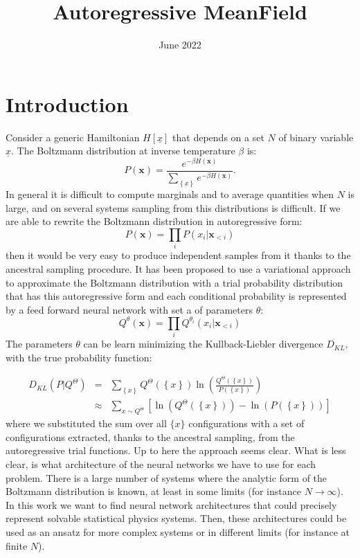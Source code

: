 \documentclass{article}
\title{Autoregressive MeanField}
\date{June 2022}
\begin{document}
\maketitle

\tableofcontents

\section{Introduction}
Consider a generic Hamiltonian $H[\underline{x}]$ that depends on a set $N$ of binary variable $\underline{x}$. The Boltzmann distribution at inverse temperature $\beta$ is:
\begin{equation}
P\left(\mathbf{x}\right)=\frac{e^{-\beta H\left(\mathbf{x}\right)}}{\sum_{\left\{ x\right\} }e^{-\beta H\left(\mathbf{x}\right)}}.
\end{equation}
In general it is difficult to compute marginals and to average quantities when $N$ is large, and on several systems sampling from this distributions is difficult. If we are able to rewrite the Boltzmann distribution in autoregressive form:
\begin{equation}
P\left(\mathbf{x}\right)=\prod_{i}P\left(x_{i}|\mathbf{x}_{<i}\right)
\end{equation}
then it would be very easy to produce independent samples from it thanks to the ancestral sampling procedure. It has been proposed to use a variational approach to approximate the Boltzmann distribution with a trial probability distribution that has this autoregressive form and each conditional probability is represented by a feed forward neural network with set a of parameters ${\theta}$:
\begin{equation}
Q^{\theta}\left(\mathbf{x}\right)=\prod_{i}Q^{\theta_i}\left(x_{i}|\mathbf{x}_{<i}\right)
\end{equation}
The parameters ${\theta}$ can be learn minimizing the Kullback-Liebler divergence $D_{KL}$,
with the true probability function:

\begin{eqnarray*}
D_{KL}\left(P|Q^{\Theta}\right) & = & \sum_{\left\{ x\right\} }Q^{\Theta}\left(\left\{ x\right\} \right)\ln\left(\frac{Q^{\Theta}\left(\left\{ x\right\} \right)}{P\left(\left\{ x\right\} \right)}\right)\\
 & \approx & \sum_{x\sim Q^{\Theta}}\left[\ln\left(Q^{\Theta}\left(\left\{ x\right\} \right)\right)-\ln\left(P\left(\left\{ x\right\} \right)\right)\right]
\end{eqnarray*}
where we substituted the sum over all $\{x\}$ configurations with a set of configurations extracted, thanks to the ancestral sampling, from the autoregressive trial functions.
Up to here the approach seems clear. What is less clear, is what architecture of the neural networks we have to use for each problem.
There is a large number of systems where the analytic form of the Boltzmann distribution is known, at least in some limits (for instance $N\rightarrow \infty$). 
In this work we want to find neural network architectures that could precisely represent solvable statistical physics systems. 
Then, these architectures could be used as an ansatz for more complex systems or in different limits (for instance at finite $N$).
\end{document}
